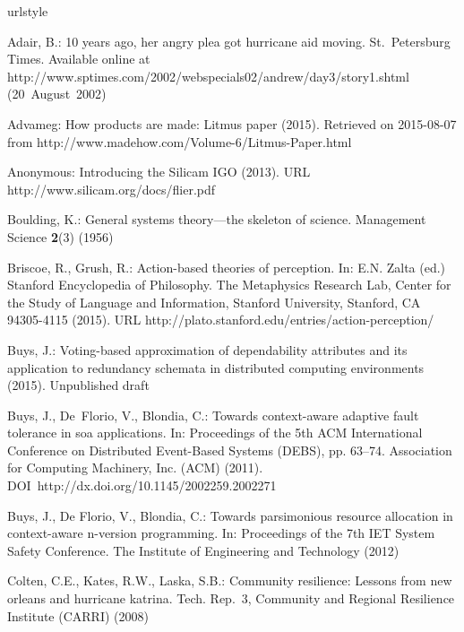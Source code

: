 \documentclass[twocolumn]{svjour3}
\begin{document}
\begin{thebibliography}{10}
\providecommand{\url}[1]{{#1}}
\providecommand{\urlprefix}{URL }
\expandafter\ifx\csname urlstyle\endcsname\relax
  \providecommand{\doi}[1]{DOI~\discretionary{}{}{}#1}\else
  \providecommand{\doi}{DOI~\discretionary{}{}{}\begingroup
  \urlstyle{rm}\Url}\fi

Adair, B.: 10 years ago, her angry plea got hurricane aid moving.
\newblock St.~Petersburg Times. Available online at
  \url{http://www.sptimes.com/2002/webspecials02/andrew/day3/story1.shtml}
  (20~August~2002)

Advameg: How products are made: Litmus paper (2015).
\newblock Retrieved on 2015-08-07 from
  \url{http://www.madehow.com/Volume-6/Litmus-Paper.html}

Anonymous: Introducing the {S}ilicam {IGO} (2013).
\newblock \urlprefix\url{http://www.silicam.org/docs/flier.pdf}

Boulding, K.: General systems theory---the skeleton of science.
\newblock Management Science \textbf{2}(3) (1956)

Briscoe, R., Grush, R.: Action-based theories of perception.
\newblock In: E.N. Zalta (ed.) Stanford Encyclopedia of Philosophy. The
  Metaphysics Research Lab, Center for the Study of Language and Information,
  Stanford University, Stanford, CA 94305-4115 (2015).
\newblock \urlprefix\url{http://plato.stanford.edu/entries/action-perception/}

Buys, J.: Voting-based approximation of dependability attributes and its
  application to redundancy schemata in distributed computing environments
  (2015).
\newblock Unpublished draft

Buys, J., {De~Florio}, V., Blondia, C.: Towards context-aware adaptive fault
  tolerance in soa applications.
\newblock In: Proceedings of the 5th ACM International Conference on
  Distributed Event-Based Systems (DEBS), pp. 63--74. Association for Computing
  Machinery, Inc. (ACM) (2011).
\newblock \doi{http://dx.doi.org/10.1145/2002259.2002271}

Buys, J., {De Florio}, V., Blondia, C.: Towards parsimonious resource
  allocation in context-aware n-version programming.
\newblock In: Proceedings of the 7th IET System Safety Conference. The
  Institute of Engineering and Technology (2012)

Colten, C.E., Kates, R.W., Laska, S.B.: Community resilience: Lessons from new
  orleans and hurricane katrina.
\newblock Tech. Rep.~3, Community and Regional Resilience Institute (CARRI)
  (2008)


\end{thebibliography}
\end{document}
